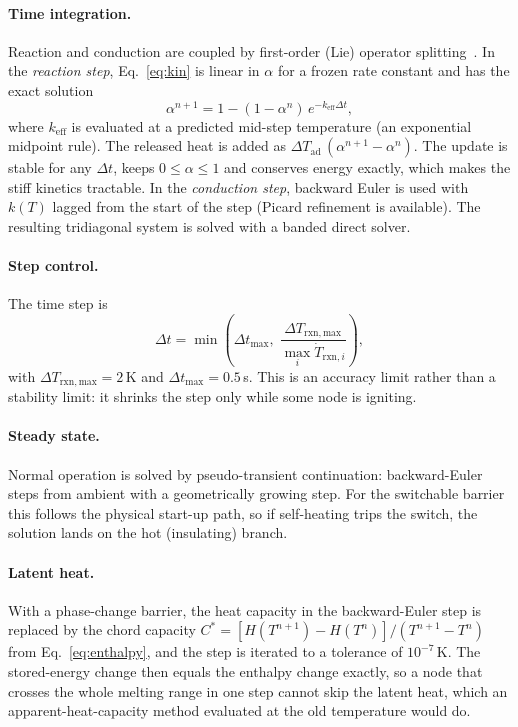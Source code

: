 \documentclass[11pt]{article}
\begin{document}
\paragraph{Time integration.} Reaction and conduction are coupled by first-order (Lie)
operator splitting~\cite{strang1968}. In the \emph{reaction step}, Eq.~\eqref{eq:kin} is
linear in $\alpha$ for a frozen rate constant and has the exact solution
\begin{equation}
  \alpha^{n+1} = 1 - (1-\alpha^n)\,e^{-k_\mathrm{eff}\Delta t},
  \label{eq:expupdate}
\end{equation}
where $k_\mathrm{eff}$ is evaluated at a predicted mid-step temperature (an exponential
midpoint rule). The released heat is added as
$\Delta T_\mathrm{ad}\,(\alpha^{n+1}-\alpha^n)$. The update is stable for any
$\Delta t$, keeps $0\le\alpha\le1$ and conserves energy exactly, which makes the stiff
kinetics tractable. In the \emph{conduction step}, backward Euler is used with $k(T)$
lagged from the start of the step (Picard refinement is available). The resulting
tridiagonal system is solved with a banded direct solver.

\paragraph{Step control.} The time step is
\begin{equation}
  \Delta t = \min\!\left(\Delta t_\mathrm{max},\;
  \frac{\Delta T_\mathrm{rxn,max}}{\max_i \dot T_{\mathrm{rxn},i}}\right),
  \label{eq:dt}
\end{equation}
with $\Delta T_\mathrm{rxn,max} = 2$\,K and $\Delta t_\mathrm{max} = 0.5$\,s. This is an
accuracy limit rather than a stability limit: it shrinks the step only while some node
is igniting.

\paragraph{Steady state.} Normal operation is solved by pseudo-transient continuation:
backward-Euler steps from ambient with a geometrically growing step. For the switchable
barrier this follows the physical start-up path, so if self-heating trips the switch,
the solution lands on the hot (insulating) branch.

\paragraph{Latent heat.} With a phase-change barrier, the heat capacity in the
backward-Euler step is replaced by the chord capacity
$C^\ast = [H(T^{n+1}) - H(T^n)]/(T^{n+1} - T^n)$ from Eq.~\eqref{eq:enthalpy}, and the
step is iterated to a tolerance of $10^{-7}$\,K. The stored-energy change then equals the
enthalpy change exactly, so a node that crosses the whole melting range in one step
cannot skip the latent heat, which an apparent-heat-capacity method evaluated at the old
temperature would do.
\end{document}
